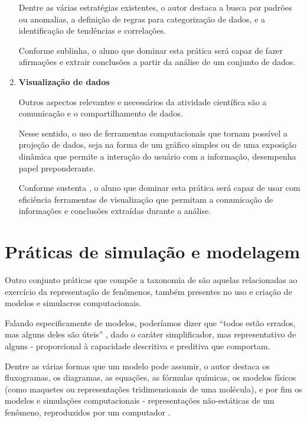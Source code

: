 \begin{enumerate}
  Dentre as várias estratégias existentes, o autor destaca a busca por padrões ou anomalias, a definição de regras para categorização de dados, e a identificação de tendências e correlações. 

  Conforme sublinha, o aluno que dominar esta prática será capaz de fazer afirmações e extrair conclusões a partir da análise de um conjunto de dados.


  \item \textbf{Visualização de dados}

  Outros aspectos relevantes e necessários da atividade científica são a comunicação e o compartilhamento de dados.

  Nesse sentido, o uso de ferramentas computacionais que tornam possível a projeção de dados, seja na forma de um gráfico simples ou de uma exposição dinâmica que permite a interação do usuário com a informação, desempenha papel preponderante.

  Conforme sustenta , o aluno que dominar esta prática será capaz de usar com eficiência ferramentas de visualização que permitam a comunicação de informações e conclusões extraídas durante a análise.

\end{enumerate}

\section{Práticas de simulação e modelagem}

Outro conjunto práticas que compõe a taxonomia de  são aquelas relacionadas ao exercício da representação de fenômenos, também presentes no uso e criação de modelos e simulacros computacionais. 

Falando especificamente de modelos, poderíamos dizer que ``todos estão errados, mas alguns deles são úteis'' , dado o caráter simplificador, mas representativo de alguns - proporcional à capacidade descritiva e preditiva que comportam. 

Dentre as várias formas que um modelo pode assumir, o autor destaca os fluxogramas, os diagramas, as equações, as fórmulas químicas, os modelos físicos (como maquetes ou representações tridimensionais de uma molécula), e por fim os modelos e simulações computacionais - representações não-estáticas de um fenômeno, reproduzidos por um computador \cite{Weintrop2016}.

